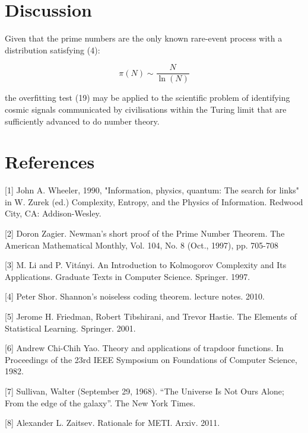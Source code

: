 \documentclass{article}
\begin{document}
\newpage

\section{Discussion}

Given that the prime numbers are the only known rare-event process with a distribution satisfying (4): 

\begin{equation}
\pi(N) \sim \frac{N}{\ln(N)}	
\end{equation}

the overfitting test (19) may be applied to the scientific problem of identifying cosmic signals communicated by civilisations within the Turing limit that are 
sufficiently advanced to do number theory. 

\section*{References}

\small

[1] John A. Wheeler, 1990, "Information, physics, quantum: The search for links" in W. Zurek (ed.) Complexity, Entropy, and the Physics of Information. Redwood City, CA: Addison-Wesley.

[2] Doron Zagier. Newman’s short proof of the Prime Number Theorem. The American Mathematical Monthly, Vol. 104, No. 8 (Oct., 1997), pp. 705-708

[3] M. Li and P. Vitányi. An Introduction to Kolmogorov Complexity and Its Applications. Graduate Texts in Computer Science. Springer. 1997.

[4] Peter Shor. Shannon’s noiseless coding theorem. lecture notes. 2010.

[5] Jerome H. Friedman, Robert Tibshirani, and Trevor Hastie. The Elements of Statistical Learning. Springer. 2001.

[6] Andrew Chi-Chih Yao. Theory and applications of trapdoor functions. In Proceedings of the 23rd IEEE Symposium on Foundations of Computer Science, 1982.

[7] Sullivan, Walter (September 29, 1968). “The Universe Is Not Ours Alone; From the edge of the galaxy”. The New York Times.

[8] Alexander L. Zaitsev. Rationale for METI. Arxiv. 2011.
\end{document}
